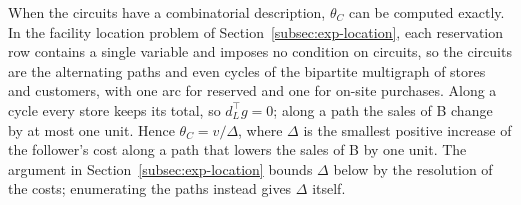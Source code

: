 \begin{remark}
When the circuits have a combinatorial description, $\theta_{C}$ can be
computed exactly. In the facility location problem of
Section~\ref{subsec:exp-location}, each reservation row contains a single
variable and imposes no condition on circuits, so the circuits are the
alternating paths and even cycles of the bipartite multigraph of stores and
customers, with one arc for reserved and one for on-site purchases. Along a
cycle every store keeps its total, so $d_L^\top g = 0$; along a path the sales
of B change by at most one unit. Hence $\theta_{C} = v/\Delta$, where $\Delta$
is the smallest positive increase of the follower's cost along a path that
lowers the sales of B by one unit. The argument in
Section~\ref{subsec:exp-location} bounds $\Delta$ below by the resolution of the
costs; enumerating the paths instead gives $\Delta$ itself.
\end{remark}

